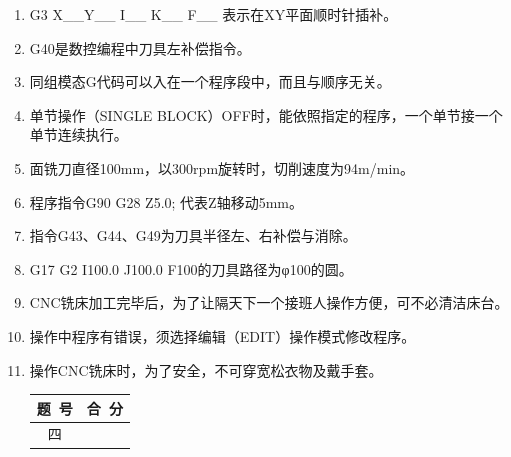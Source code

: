 \documentclass[12pt,twocolumn,landscape,UTF8,twoside]{ctexart}
\begin{document}
\begin{spacing}{1.3}
\begin{enumerate} [1、]
\item G3 X\_\_Y\_\_ I\_\_ K\_\_ F\_\_ 表示在XY平面顺时针插补。
\item G40是数控编程中刀具左补偿指令。
\item 同组模态G代码可以入在一个程序段中，而且与顺序无关。
\item 单节操作（SINGLE BLOCK）OFF时，能依照指定的程序，一个单节接一个单节连续执行。
\item 面铣刀直径100mm，以300rpm旋转时，切削速度为94m/min。
\item 程序指令G90 G28 Z5.0; 代表Z轴移动5mm。
\item 指令G43、G44、G49为刀具半径左、右补偿与消除。
\item G17 G2 I100.0 J100.0 F100的刀具路径为φ100的圆。
\item CNC铣床加工完毕后，为了让隔天下一个接班人操作方便，可不必清洁床台。
\item 操作中程序有错误，须选择编辑（EDIT）操作模式修改程序。
\item 操作CNC铣床时，为了安全，不可穿宽松衣物及戴手套。

\vspace{1cm}
	
\item[\heiti
\begin{minipage}{\@}	\begin{tabular}{|c|c|}\hline
		题~号 & 合~分\\ \hline		四&       \\\hline	\end{tabular}\end{minipage} ]


\end{enumerate}
\end{spacing}
\end{document}
